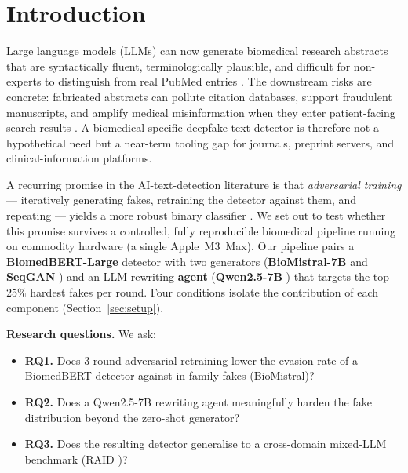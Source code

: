 \section{Introduction}
\label{sec:introduction}

Large language models (LLMs) can now generate biomedical research abstracts
that are syntactically fluent, terminologically plausible, and difficult for
non-experts to distinguish from real PubMed entries
\cite{else2023chatgpt,liang2023gptdetect}. The downstream risks are concrete:
fabricated abstracts can pollute citation databases, support fraudulent
manuscripts, and amplify medical misinformation when they enter
patient-facing search results \cite{majovsky2023artificialintelligence}. A
biomedical-specific deepfake-text detector is therefore not a hypothetical
need but a near-term tooling gap for journals, preprint servers, and
clinical-information platforms.

A recurring promise in the AI-text-detection literature is that
\emph{adversarial training} — iteratively generating fakes, retraining the
detector against them, and repeating — yields a more robust binary
classifier \cite{zellers2019defending,mitchell2023detectgpt,hu2023radar}. We set out to test whether this promise survives a
controlled, fully reproducible biomedical pipeline running on commodity
hardware (a single Apple~M3~Max). Our pipeline pairs a
\textbf{BiomedBERT-Large} detector \cite{gu2021biomedbert} with two
generators (\textbf{BioMistral-7B} \cite{labrak2024biomistral} and
\textbf{SeqGAN} \cite{yu2017seqgan}) and an LLM rewriting
\textbf{agent} (\textbf{Qwen2.5-7B} \cite{qwen2024technical}) that targets
the top-\(25\%\) hardest fakes per round. Four conditions isolate the
contribution of each component (Section~\ref{sec:setup}).

\textbf{Research questions.} We ask:
\begin{itemize}
\item \textbf{RQ1.} Does 3-round adversarial retraining lower the evasion
  rate of a BiomedBERT detector against in-family fakes
  (BioMistral)?
\item \textbf{RQ2.} Does a Qwen2.5-7B rewriting agent meaningfully harden
  the fake distribution beyond the zero-shot generator?
\item \textbf{RQ3.} Does the resulting detector generalise to a
  cross-domain mixed-LLM benchmark (RAID \cite{dugan2024raid})?
\end{itemize}

